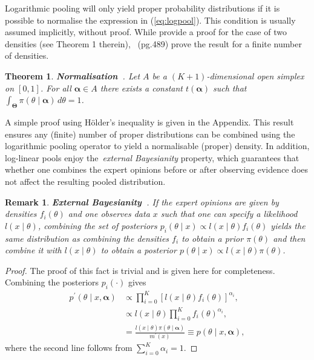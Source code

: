 \documentclass[a4paper, notitlepage, 10pt]{article}
\newtheorem{theo}{Theorem}[]
\newtheorem{remark}{Remark}[]
\begin{document}
Logarithmic pooling will only yield proper probability distributions if it is possible to normalise the expression in (\ref{eq:logpool}).
This condition is usually assumed implicitly, without proof.
While \citet{Poole2000} provide a proof for the case of two densities (see Theorem 1 therein),~\cite{Genest1986A} (pg.489) prove the result for a finite number of densities.
\begin{theo}
\label{thm:normalisation}
\textbf{Normalisation~\citep{Genest1986A}}. 
Let $A$ be a $(K+1)$-dimensional open simplex on $[0,1]$.
For all $\boldsymbol\alpha \in A$ there exists a constant $t(\boldsymbol\alpha)$ such that $\int_{\boldsymbol\Theta}\pi(\theta \mid \boldsymbol \alpha)\, d\theta = 1$.
\end{theo}
A simple proof using H\"{o}lder's inequality is given in the Appendix.
This result ensures any (finite) number of proper distributions can be combined using the logarithmic pooling operator to yield a normalisable (proper) density.
In addition, log-linear pools enjoy the~\textit{external Bayesianity} property, which guarantees that whether one combines the expert opinions before or after observing evidence does not affect the resulting pooled distribution.
\begin{remark}
 \textbf{External Bayesianity~\citep{Genest1984}}. If the expert opinions are given by densities $f_i(\theta)$ and one observes data $x$ such that one can specify a likelihood $l(x \mid \theta)$, combining the set of posteriors $p_i(\theta \mid x) \propto  l(x \mid \theta)f_i(\theta) $ yields the same distribution as combining the densities $f_i$ to obtain a prior $\pi(\theta)$ and then combine it with $l(x \mid \theta)$ to obtain a posterior $p(\theta \mid x) \propto l(x \mid \theta)\pi(\theta)$.
\end{remark}
\begin{proof}
 The proof of this fact is trivial and is given here for completeness.
 Combining the posteriors $p_i(\cdot)$ gives
 \begin{align*}
  p^\prime (\theta \mid x, \boldsymbol \alpha) &\propto \prod_{i = 0}^K \left[  l(x \mid \theta)f_i(\theta) \right]^{\alpha_i},\\
  &\propto   l(x \mid \theta) \prod_{i = 0}^K f_i(\theta)^{\alpha_i},\\
  &=  \frac{l(x \mid \theta)\pi(\theta \mid \boldsymbol \alpha)}{m^{\prime}(x)} \equiv   p(\theta \mid x, \boldsymbol \alpha),
 \end{align*}
 where the second line follows from $\sum_{i=0}^K \alpha_i = 1$.
\end{proof}
\end{document}
